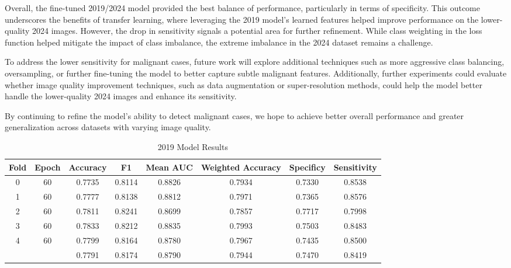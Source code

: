 \documentclass{article}
\begin{document}
Overall, the fine-tuned 2019/2024 model provided the best balance of performance, particularly in terms of
specificity. This outcome underscores the benefits of transfer learning, where leveraging the 2019 model’s learned
features helped improve performance on the lower-quality 2024 images. However, the drop in sensitivity signals a
potential area for further refinement. While class weighting in the loss function helped mitigate the impact of class
imbalance, the extreme imbalance in the 2024 dataset remains a challenge.

To address the lower sensitivity for malignant cases, future work will explore additional techniques such as more
aggressive class balancing, oversampling, or further fine-tuning the model to better capture subtle malignant
features. Additionally, further experiments could evaluate whether image quality improvement techniques, such as
data augmentation or super-resolution methods, could help the model better handle the lower-quality 2024 images
and enhance its sensitivity.

By continuing to refine the model’s ability to detect malignant cases, we hope to achieve better overall performance
and greater generalization across datasets with varying image quality.

\begin{table*}[t]
\caption{2019 Model Results}
\label{2019table}
\vskip 0.15in
\begin{center}
\begin{small}
\begin{sc}
\begin{tabular*}{\linewidth}{@{\extracolsep{\fill}} cccccccc}
\toprule
Fold & Epoch & Accuracy & F1 & Mean AUC & Weighted Accuracy & Specificy & Sensitivity \\
\midrule
0 & 60 & 0.7735 & 0.8114 & 0.8826 & 0.7934 & 0.7330 & 0.8538 \\
1 & 60 & 0.7777 & 0.8138 & 0.8812 & 0.7971 & 0.7365 & 0.8576 \\
2 & 60 & 0.7811 & 0.8241 & 0.8699 & 0.7857 & 0.7717 & 0.7998 \\
3 & 60 & 0.7833 & 0.8212 & 0.8835 & 0.7993 & 0.7503 & 0.8483 \\
4 & 60 & 0.7799 & 0.8164 & 0.8780 & 0.7967 & 0.7435 & 0.8500 \\
\midrule
  &    & 0.7791 & 0.8174 & 0.8790 & 0.7944 & 0.7470 & 0.8419 \\
\bottomrule
\end{tabular*}
\end{sc}
\end{small}
\end{center}
\vskip -0.1in
\end{table*}
\end{document}
